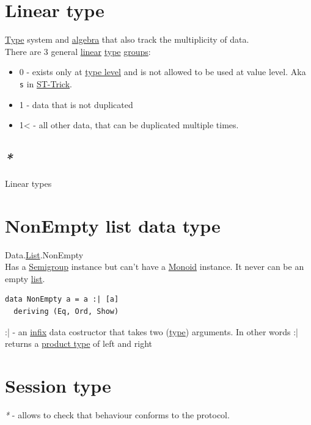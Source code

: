\documentclass[a4paper,14pt,oneside]{book}
\begin{document}
\section{\label{org5bf9522}Linear type}
\label{sec:org4ad3d53}
\hyperref[org258d25a]{Type} system and \hyperref[org7212e77]{algebra} that also track the multiplicity of data.\\
There are 3 general \hyperref[org0b9e6aa]{linear} \hyperref[org258d25a]{type} \hyperref[org071df7c]{groups}:\\
\begin{itemize}
\item 0 - exists only at \hyperref[org4e77061]{type level} and is not allowed to be used at value level. Aka \texttt{s} in \hyperref[orgbf65fc9]{ST-Trick}.\\
\item 1 - data that is not duplicated\\
\item 1< - all other data, that can be duplicated multiple times.\\
\end{itemize}

\subsection{\emph{*}}
\label{sec:orgd74d821}

\label{org37bf142}Linear types\\

\section{\label{org5229927}NonEmpty list data type}
\label{sec:orgd697cb9}
Data.\hyperref[orgd49464d]{List}.NonEmpty\\
Has a \hyperref[org19e1115]{Semigroup} instance but can't have a \hyperref[orgfc29e06]{Monoid} instance. It never can be an empty \hyperref[orgd49464d]{list}.\\

\begin{verbatim}
data NonEmpty a = a :| [a]
  deriving (Eq, Ord, Show)
\end{verbatim}

:| - an \hyperref[orgb29d792]{infix} data costructor that takes two (\hyperref[org258d25a]{type}) arguments. In other words :| returns a \hyperref[orgcfe49ae]{product type} of left and right\\

\section{\label{org9cae818}Session type}
\label{sec:orgef83af0}
\emph{*} - allows to check that behaviour conforms to the protocol.\\
\end{document}
